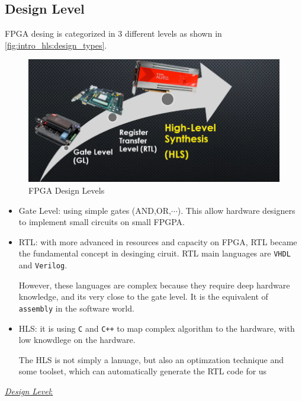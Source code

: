 \subsection{Design Level}

FPGA desing is categorized in 3 different levels as shown in \autoref{fig:intro_hls:design_types}.

\begin{figure}[h]
\centering
\includegraphics[scale=0.5,frame]{Figures/intro_hls/design_types}
\caption{FPGA Design Levels}
\label{fig:intro_hls:design_types}
\end{figure}

\begin{itemize}

\item Gate Level: using simple gates (AND,OR,$\cdots$). This allow hardware designers to implement small circuits on small FPGPA.

\item RTL: with more advanced in resources and capacity on FPGA, RTL became the fundamental concept in desinging ciruit. RTL main languages are \verb|VHDL| and \verb|Verilog|.

However, these languages are complex because they require deep hardware knowledge, and its very close to the gate level. It is the equivalent of \verb|assembly| in the software world.

\item HLS: it is using \verb|C| and \verb|C++| to map complex algorithm to the hardware, with low knowdlege on the hardware. 

The HLS is not simply a lanuage, but also an optimzation technique and some toolset, which can automatically generate the RTL code for us

\end{itemize}

 \underline{\textit{Design Level}:}

